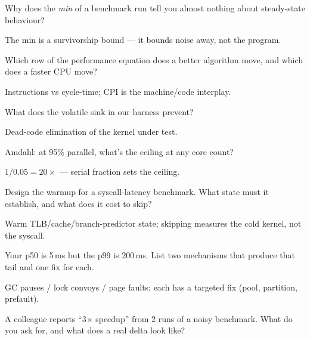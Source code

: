 \begin{exercise}[easy]
Why does the \emph{min} of a benchmark run tell you almost nothing
about steady-state behaviour?
\end{exercise}
\begin{solution}[hint]
The min is a survivorship bound --- it bounds noise away, not the
program.
\end{solution}
\begin{exercise}[easy]
Which row of the performance equation does a better algorithm
move, and which does a faster CPU move?
\end{exercise}
\begin{solution}[hint]
Instructions vs cycle-time; CPI is the machine/code interplay.
\end{solution}
\begin{exercise}[easy]
What does the volatile sink in our harness prevent?
\end{exercise}
\begin{solution}[hint]
Dead-code elimination of the kernel under test.
\end{solution}
\begin{exercise}[easy]
Amdahl: at 95\% parallel, what's the ceiling at any core count?
\end{exercise}
\begin{solution}[hint]
$1/0.05=20\times$ --- serial fraction sets the ceiling.
\end{solution}
\begin{exercise}[medium]
Design the warmup for a syscall-latency benchmark. What state must
it establish, and what does it cost to skip?
\end{exercise}
\begin{solution}[hint]
Warm TLB/cache/branch-predictor state; skipping measures the cold
kernel, not the syscall.
\end{solution}
\begin{exercise}[medium]
Your p50 is 5\,ms but the p99 is 200\,ms. List two mechanisms that
produce that tail and one fix for each.
\end{exercise}
\begin{solution}[hint]
GC pauses / lock convoys / page faults; each has a targeted fix
(pool, partition, prefault).
\end{solution}
\begin{exercise}[medium]
A colleague reports ``3$\times$ speedup'' from 2 runs of a noisy
benchmark. What do you ask for, and what does a real delta look
like?
\end{exercise}
